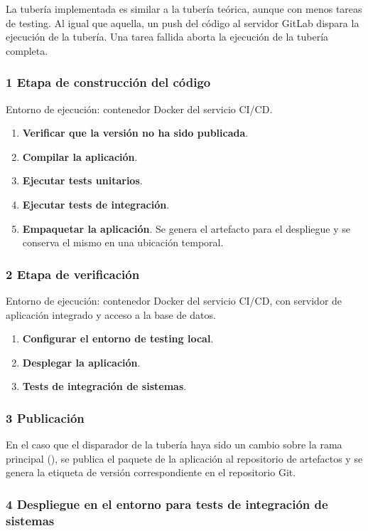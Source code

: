 La tubería implementada es similar a la tubería teórica, aunque con
menos tareas de testing. Al igual que aquella, un push del código al
servidor GitLab dispara la ejecución de la tubería. Una tarea fallida
aborta la ejecución de la tubería completa.

\subsubsection{1 Etapa de construcción del código}

Entorno de ejecución: contenedor Docker del servicio CI/CD.

\begin{enumerate}
\item \textbf{Verificar que la versión no ha sido publicada}.
\item \textbf{Compilar la aplicación}.
\item \textbf{Ejecutar tests unitarios}.
\item \textbf{Ejecutar tests de integración}.
\item \textbf{Empaquetar la aplicación}. Se genera el artefacto para
  el despliegue y se conserva el mismo en una ubicación temporal.
\end{enumerate}
\subsubsection{2 Etapa de verificación}

Entorno de ejecución: contenedor Docker del servicio CI/CD, con
servidor de aplicación integrado y acceso a la base de datos.

\begin{enumerate}
\item \textbf{Configurar el entorno de testing local}.
\item \textbf{Desplegar la aplicación}.
\item \textbf{Tests de integración de sistemas}.
\end{enumerate}
\subsubsection{3 Publicación}

En el caso que el disparador de la tubería haya sido un cambio sobre
la rama principal (), se publica el paquete de la
aplicación al repositorio de artefactos y se genera la etiqueta de
versión correspondiente en el repositorio Git.

\subsubsection{4 Despliegue en el entorno para tests de integración de sistemas}

